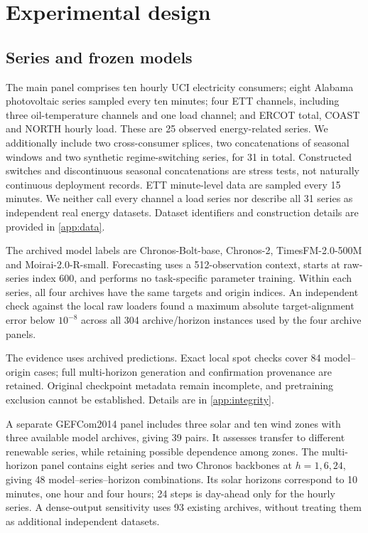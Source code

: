 \documentclass[preprint,11pt]{elsarticle}
\begin{document}
\section{Experimental design}
\subsection{Series and frozen models}
The main panel comprises ten hourly UCI electricity consumers; eight Alabama photovoltaic
series sampled every ten minutes; four ETT channels, including three oil-temperature
channels and one load channel; and ERCOT total, COAST and NORTH hourly load. These are
25 observed energy-related series. We additionally include two cross-consumer splices,
two concatenations of seasonal windows and two synthetic regime-switching series, for
31 in total. Constructed switches and discontinuous seasonal concatenations are stress
tests, not naturally continuous deployment records. ETT minute-level data are sampled
every 15 minutes. We neither call every channel a load series nor describe all 31 series
as independent real energy datasets. Dataset identifiers and construction details are
provided in \ref{app:data}.

The archived model labels are Chronos-Bolt-base, Chronos-2, TimesFM-2.0-500M and
Moirai-2.0-R-small. Forecasting uses a 512-observation context, starts at raw-series index
600, and performs no task-specific parameter training. Within each series, all four
archives have the same targets and origin indices. An independent check against the
local raw loaders found a maximum absolute target-alignment error below $10^{-8}$ across
all 304 archive/horizon instances used by the four archive panels.

The evidence uses archived predictions. Exact local spot checks cover 84 model--origin
cases; full multi-horizon generation and confirmation provenance are retained.
Original checkpoint metadata remain incomplete, and pretraining exclusion cannot
be established. Details are in \ref{app:integrity}.

A separate GEFCom2014 panel \citep{hong2016gefcom2014} includes three solar and ten wind
zones with three available model archives, giving 39 pairs. It assesses transfer to
different renewable series, while retaining possible dependence among zones. The
multi-horizon panel contains eight series and two Chronos backbones at $h=1,6,24$, giving
48 model--series--horizon combinations. Its solar horizons correspond to 10 minutes,
one hour and four hours; 24 steps is day-ahead only for the hourly series. A dense-output
sensitivity uses 93 existing archives, without treating them as additional independent
datasets.
\end{document}
